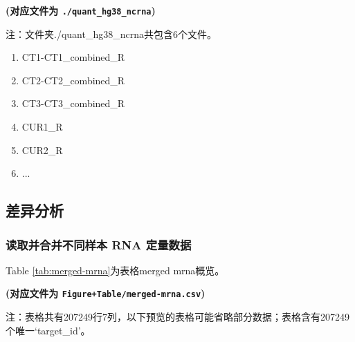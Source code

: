 \documentclass[
]{article}
\providecommand{\tightlist}{%
  \setlength{\itemsep}{0pt}\setlength{\parskip}{0pt}}
\begin{document}
\textbf{(对应文件为 \texttt{./quant\_hg38\_ncrna})}

\begin{center}\begin{tcolorbox}[colback=gray!10, colframe=gray!50, width=0.9\linewidth, arc=1mm, boxrule=0.5pt]注：文件夹./quant\_hg38\_ncrna共包含6个文件。

\begin{enumerate}\tightlist
\item CT1-CT1\_combined\_R
\item CT2-CT2\_combined\_R
\item CT3-CT3\_combined\_R
\item CUR1\_R
\item CUR2\_R
\item ...
\end{enumerate}\end{tcolorbox}
\end{center}

\hypertarget{ux5deeux5f02ux5206ux6790}{%
\subsection{差异分析}\label{ux5deeux5f02ux5206ux6790}}

\hypertarget{ux8bfbux53d6ux5e76ux5408ux5e76ux4e0dux540cux6837ux672c-rna-ux5b9aux91cfux6570ux636e}{%
\subsubsection{读取并合并不同样本 RNA 定量数据}\label{ux8bfbux53d6ux5e76ux5408ux5e76ux4e0dux540cux6837ux672c-rna-ux5b9aux91cfux6570ux636e}}

Table \ref{tab:merged-mrna}为表格merged mrna概览。

\textbf{(对应文件为 \texttt{Figure+Table/merged-mrna.csv})}

\begin{center}\begin{tcolorbox}[colback=gray!10, colframe=gray!50, width=0.9\linewidth, arc=1mm, boxrule=0.5pt]注：表格共有207249行7列，以下预览的表格可能省略部分数据；表格含有207249个唯一`target\_id'。
\end{tcolorbox}
\end{center}
\end{document}
